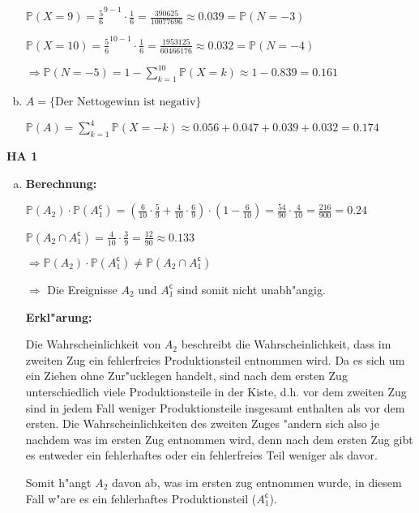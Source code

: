 \documentclass[a4paper,12pt]{article}
\newcommand{\Aufgabe}[1]{
        {
        \vspace*{0.5cm}
        \textbf{HA #1}
        \vspace*{0.2cm}
    }
}
\begin{document}
\begin{enumerate}[(a)]
        $ \displaystyle \mathbb{P}(X = 9) = \frac{5}{6}^{9 - 1} \cdot \frac{1}{6} = \frac{390625}{10077696} \approx 0.039 = \mathbb{P}(N = -3)$

        $ \displaystyle \mathbb{P}(X = 10) = \frac{5}{6}^{10 - 1} \cdot \frac{1}{6} = \frac{1953125}{60466176} \approx 0.032 = \mathbb{P}(N = -4) $

        $ \Rightarrow \mathbb{P}(N = -5) = 1 - \sum\limits_{k = 1}^{10} \mathbb{P}(X = k) \approx 1 - 0.839 = 0.161 $

        \item

        $ A = \{\text{Der Nettogewinn ist negativ}\} $

        $ \mathbb{P}(A) = \sum\limits_{k = 1}^{4} \mathbb{P}(X = -k) \approx 0.056 + 0.047 + 0.039 + 0.032 =  0.174 $
    \end{enumerate}

    \newpage

    \Aufgabe{1}

    \begin{enumerate}[(b)]
        \item 

        \textbf{Berechnung:}

        $ \displaystyle \mathbb{P}(A_2) \cdot \mathbb{P}(A_1^{\mathsf{c}}) = (\frac{6}{10} \cdot \frac{5}{9} + \frac{4}{10} \cdot \frac{6}{9}) \cdot (1 - \frac{6}{10}) = \frac{54}{90} \cdot \frac{4}{10} = \frac{216}{900} = 0.24 $

        $ \displaystyle \mathbb{P}(A_2 \cap A_1^{\mathsf{c}}) = \frac{4}{10} \cdot \frac{3}{9} = \frac{12}{90} \approx 0.133 $

        $ \Rightarrow \mathbb{P}(A_2) \cdot \mathbb{P}(A_1^{\mathsf{c}}) \neq \mathbb{P}(A_2 \cap A_1^{\mathsf{c}}) $ 
        
        $\Rightarrow $ Die Ereignisse $ A_2 $ und $ A_1^{\mathsf{c}} $ sind somit nicht unabh"angig.

        \bigskip

        \textbf{Erkl"arung:}

        Die Wahrscheinlichkeit von $ A_2 $ beschreibt die Wahrscheinlichkeit, dass im zweiten Zug ein fehlerfreies Produktionsteil entnommen wird.
        Da es sich um ein Ziehen ohne Zur"ucklegen handelt, sind nach dem ersten Zug unterschiedlich viele Produktionsteile in der Kiste, d.h. vor dem zweiten
        Zug sind in jedem Fall weniger Produktionsteile insgesamt enthalten als vor dem ersten. Die Wahrscheinlichkeiten des zweiten Zuges "andern sich also je nachdem 
        was im ersten Zug entnommen wird, denn nach dem ersten Zug gibt es entweder ein fehlerhaftes oder ein fehlerfreies Teil weniger als davor. 
        
        Somit h"angt $ A_2 $ davon ab, was im ersten zug entnommen wurde, in diesem Fall w"are es ein fehlerhaftes Produktionsteil ($ A_1^{\mathsf{c}} $).
    \end{enumerate}
\end{document}
